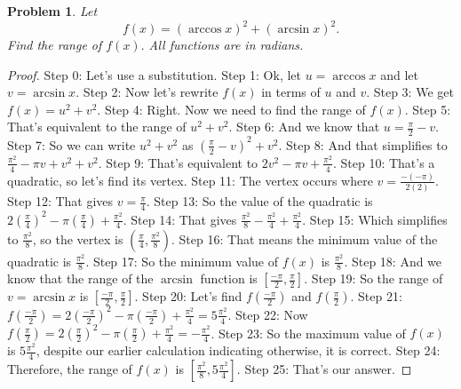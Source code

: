 \documentclass{article}
\newtheorem{theorem}{Problem}
\begin{document}
\begin{theorem}
Let\n\[f(x) = (\arccos x)^2 + (\arcsin x)^2.\]Find the range of $f(x).$ All functions are in radians.
\end{theorem}

\begin{proof}
Step 0: Let's use a substitution.
Step 1: Ok, let $u=\arccos x$ and let $v=\arcsin x$.
Step 2: Now let's rewrite $f(x)$ in terms of $u$ and $v$.
Step 3: We get $f(x)=u^2+v^2$.
Step 4: Right. Now we need to find the range of $f(x)$.
Step 5: That's equivalent to the range of $u^2+v^2$.
Step 6: And we know that $u=\frac{\pi}{2}-v$.
Step 7: So we can write $u^2+v^2$ as $(\frac{\pi}{2}-v)^2+v^2$.
Step 8: And that simplifies to $\frac{\pi^2}{4}-\pi v+v^2+v^2$.
Step 9: That's equivalent to $2v^2-\pi v+\frac{\pi^2}{4}$.
Step 10: That's a quadratic, so let's find its vertex.
Step 11: The vertex occurs where $v=\frac{-(-\pi)}{2(2)}$.
Step 12: That gives $v=\frac{\pi}{4}$.
Step 13: So the value of the quadratic is $2(\frac{\pi}{4})^2-\pi(\frac{\pi}{4})+\frac{\pi^2}{4}$.
Step 14: That gives $\frac{\pi^2}{8}-\frac{\pi^2}{4}+\frac{\pi^2}{4}$.
Step 15: Which simplifies to $\frac{\pi^2}{8}$, so the vertex is $(\frac{\pi}{4},\frac{\pi^2}{8})$.
Step 16: That means the minimum value of the quadratic is $\frac{\pi^2}{8}$.
Step 17: So the minimum value of $f(x)$ is $\frac{\pi^2}{8}$.
Step 18: And we know that the range of the $\arcsin$ function is $[\frac{-\pi}{2}, \frac{\pi}{2}]$.
Step 19: So the range of $v=\arcsin x$ is $[\frac{-\pi}{2}, \frac{\pi}{2}]$.
Step 20: Let's find $f(\frac{-\pi}{2})$ and $f(\frac{\pi}{2})$.
Step 21: $f(\frac{-\pi}{2})= 2(\frac{-\pi}{2})^2-\pi (\frac{-\pi}{2})+\frac{\pi^2}{4}=5\frac{\pi^2}{4}$.
Step 22: Now $f(\frac{\pi}{2})=2(\frac{\pi}{2})^2-\pi (\frac{\pi}{2})+\frac{\pi^2}{4}=-\frac{\pi^2}{4}$.
Step 23: So the maximum value of $f(x)$ is $5\frac{\pi^2}{4}$, despite our earlier calculation indicating otherwise, it is correct.
Step 24: Therefore, the range of $f(x)$ is $[\frac{\pi^2}{8}, 5\frac{\pi^2}{4}]$.
Step 25: That's our answer.
\end{proof}
\end{document}
